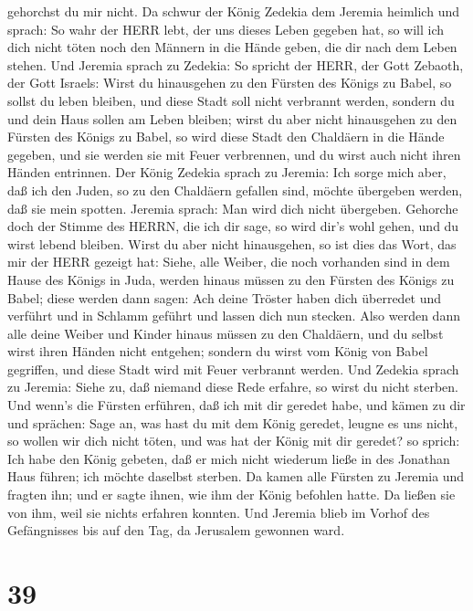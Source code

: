 gehorchst du mir nicht.  Da schwur der König Zedekia dem
Jeremia heimlich und sprach: So wahr der HERR lebt, der uns dieses Leben
gegeben hat, so will ich dich nicht töten noch den Männern in die Hände
geben, die dir nach dem Leben stehen.  Und Jeremia sprach
zu Zedekia: So spricht der HERR, der Gott Zebaoth, der Gott Israels:
Wirst du hinausgehen zu den Fürsten des Königs zu Babel, so sollst du
leben bleiben, und diese Stadt soll nicht verbrannt werden, sondern du
und dein Haus sollen am Leben bleiben;  wirst du aber nicht
hinausgehen zu den Fürsten des Königs zu Babel, so wird diese Stadt den
Chaldäern in die Hände gegeben, und sie werden sie mit Feuer verbrennen,
und du wirst auch nicht ihren Händen entrinnen.  Der König
Zedekia sprach zu Jeremia: Ich sorge mich aber, daß ich den Juden, so zu
den Chaldäern gefallen sind, möchte übergeben werden, daß sie mein
spotten.  Jeremia sprach: Man wird dich nicht übergeben.
Gehorche doch der Stimme des HERRN, die ich dir sage, so wird dir's wohl
gehen, und du wirst lebend bleiben.  Wirst du aber nicht
hinausgehen, so ist dies das Wort, das mir der HERR gezeigt hat:
 Siehe, alle Weiber, die noch vorhanden sind in dem Hause
des Königs in Juda, werden hinaus müssen zu den Fürsten des Königs zu
Babel; diese werden dann sagen: Ach deine Tröster haben dich überredet
und verführt und in Schlamm geführt und lassen dich nun stecken.
 Also werden dann alle deine Weiber und Kinder hinaus
müssen zu den Chaldäern, und du selbst wirst ihren Händen nicht
entgehen; sondern du wirst vom König von Babel gegriffen, und diese
Stadt wird mit Feuer verbrannt werden.  Und Zedekia sprach
zu Jeremia: Siehe zu, daß niemand diese Rede erfahre, so wirst du nicht
sterben.  Und wenn's die Fürsten erführen, daß ich mit dir
geredet habe, und kämen zu dir und sprächen: Sage an, was hast du mit
dem König geredet, leugne es uns nicht, so wollen wir dich nicht töten,
und was hat der König mit dir geredet?  so sprich: Ich habe
den König gebeten, daß er mich nicht wiederum ließe in des Jonathan Haus
führen; ich möchte daselbst sterben.  Da kamen alle Fürsten
zu Jeremia und fragten ihn; und er sagte ihnen, wie ihm der König
befohlen hatte. Da ließen sie von ihm, weil sie nichts erfahren konnten.
 Und Jeremia blieb im Vorhof des Gefängnisses bis auf den
Tag, da Jerusalem gewonnen ward.

\hypertarget{section-38}{%
\section{39}\label{section-38}}

